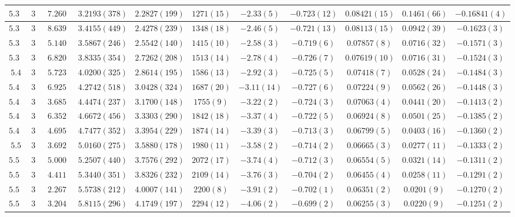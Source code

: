 \begin{table}
\begin{center}
\begin{tabular}{c|c|c|c|c|c|c|c|c|c|c}
\hline
$5.32$ & $36$ & $7.2602$ & $3.2193(378)$ & $2.2827(199)$ & $1271(15)$ & $-2.33(5)$ & $-0.723(12)$ & $0.08421(15)$ & $0.1461(66)$ & $-0.16841(4)$ \\
\hline
$5.34$ & $36$ & $8.6395$ & $3.4155(449)$ & $2.4278(239)$ & $1348(18)$ & $-2.46(5)$ & $-0.721(13)$ & $0.08113(15)$ & $0.0942(39)$ & $-0.1623(3)$ \\
\hline
$5.36$ & $36$ & $5.1408$ & $3.5867(246)$ & $2.5542(140)$ & $1415(10)$ & $-2.58(3)$ & $-0.719(6)$ & $0.07857(8)$ & $0.0716(32)$ & $-0.1571(3)$ \\
\hline
$5.38$ & $36$ & $6.8202$ & $3.8335(354)$ & $2.7262(208)$ & $1513(14)$ & $-2.78(4)$ & $-0.726(7)$ & $0.07619(10)$ & $0.0716(31)$ & $-0.1524(3)$ \\
\hline
$5.4$  & $36$ & $5.7238$ & $4.0200(325)$ & $2.8614(195)$ & $1586(13)$ & $-2.92(3)$ & $-0.725(5)$ & $0.07418(7)$ & $0.0528(24)$ & $-0.1484(3)$ \\
\hline
$5.42$ & $36$ & $6.9254$ & $4.2742(518)$ & $3.0428(324)$ & $1687(20)$ & $-3.11(14)$ & $-0.727(6)$ & $0.07224(9)$ & $0.0562(26)$ & $-0.1448(3)$ \\
\hline
$5.44$ & $36$ & $3.6855$ & $4.4474(237)$ & $3.1700(148)$ & $1755(9)$ & $-3.22(2)$ & $-0.724(3)$ & $0.07063(4)$ & $0.0441(20)$ & $-0.1413(2)$ \\
\hline
$5.46$ & $36$ & $6.3526$ & $4.6672(456)$ & $3.3303(290)$ & $1842(18)$ & $-3.37(4)$ & $-0.722(5)$ & $0.06924(8)$ & $0.0501(25)$ & $-0.1385(2)$ \\
\hline
$5.48$ & $36$ & $4.6959$ & $4.7477(352)$ & $3.3954(229)$ & $1874(14)$ & $-3.39(3)$ & $-0.713(3)$ & $0.06799(5)$ & $0.0403(16)$ & $-0.1360(2)$ \\
\hline
$5.5$  & $36$ & $3.6929$ & $5.0160(275)$ & $3.5880(178)$ & $1980(11)$ & $-3.58(2)$ & $-0.714(2)$ & $0.06665(3)$ & $0.0277(11)$ & $-0.1333(2)$ \\
\hline
$5.52$ & $36$ & $5.0005$ & $5.2507(440)$ & $3.7576(292)$ & $2072(17)$ & $-3.74(4)$ & $-0.712(3)$ & $0.06554(5)$ & $0.0321(14)$ & $-0.1311(2)$ \\
\hline
$5.54$ & $36$ & $4.4113$ & $5.3440(351)$ & $3.8326(232)$ & $2109(14)$ & $-3.76(3)$ & $-0.704(2)$ & $0.06455(4)$ & $0.0258(11)$ & $-0.1291(2)$ \\
\hline
$5.56$ & $36$ & $2.2671$ & $5.5738(212)$ & $4.0007(141)$ & $2200(8)$ & $-3.91(2)$ & $-0.702(1)$ & $0.06351(2)$ & $0.0201(9)$ & $-0.1270(2)$ \\
\hline
$5.58$ & $36$ & $3.2041$ & $5.8115(296)$ & $4.1749(197)$ & $2294(12)$ & $-4.06(2)$ & $-0.699(2)$ & $0.06255(3)$ & $0.0220(9)$ & $-0.1251(2)$ \\

\end{tabular}
\end{center}
\end{table}
